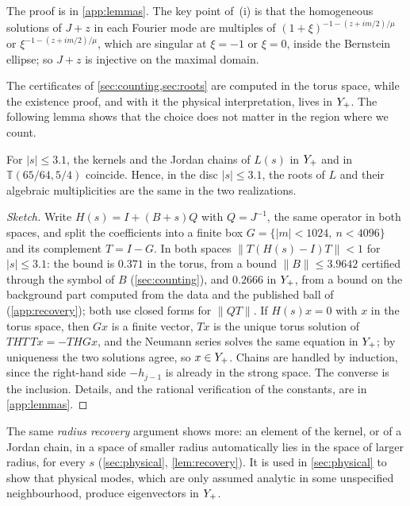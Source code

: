 The proof is in \cref{app:lemmas}. The key point of~(i) is that the homogeneous solutions of $J+z$ in each
Fourier mode are multiples of $(1+\xi)^{-1-(z+im/2)/\mu}$ or $\xi^{-1-(z+im/2)/\mu}$, which are singular at
$\xi=-1$ or $\xi=0$, inside the Bernstein ellipse; so $J+z$ is injective on the maximal domain.

The certificates of \cref{sec:counting,sec:roots} are computed in the torus space, while the existence
proof, and with it the physical interpretation, lives in $Y_{+}$. The following lemma shows that the
choice does not matter in the region where we count.

\begin{lemma}\label{lem:Lreal}
For $|s|\le 3.1$, the kernels and the Jordan chains of $L(s)$ in $Y_{+}$ and in $\mathbb T(65/64,5/4)$
coincide. Hence, in the disc $|s|\le3.1$, the roots of $L$ and their algebraic multiplicities are the same
in the two realizations.
\end{lemma}

\begin{proof}[Sketch]
Write $H(s)=I+(B+s)Q$ with $Q=J^{-1}$, the same operator in both spaces, and split the coefficients into a
finite box $G=\{|m|<1024,\ n<4096\}$ and its complement $T=I-G$. In both spaces
$\|T(H(s)-I)T\|<1$ for $|s|\le3.1$: the bound is $0.371$ in the torus, from a bound
$\|B\|\le3.9642$ certified through the symbol of $B$ (\cref{sec:counting}), and $0.2666$ in $Y_{+}$, from a bound on the
background part computed from the data and the published ball of~\cite{RT2019} (\cref{app:recovery}); both use closed forms for $\|QT\|$. If $H(s)x=0$ with $x$ in the
torus space, then $Gx$ is a finite vector, $Tx$ is the unique torus solution of
$THT\,Tx=-THGx$, and the Neumann series solves the same equation in $Y_{+}$; by uniqueness the two
solutions agree, so $x\in Y_{+}$. Chains are handled by induction, since the right-hand side
$-h_{j-1}$ is already in the strong space. The converse is the inclusion. Details, and the rational
verification of the constants, are in \cref{app:lemmas}.
\end{proof}

\begin{remark}\label{rem:radius}
The same \emph{radius recovery} argument shows more: an element of the kernel, or of a Jordan chain, in
a space of smaller radius automatically lies in the space of larger radius, for every $s$
(\cref{sec:physical}, \cref{lem:recovery}). It is used in \cref{sec:physical} to show that physical modes,
which are only assumed analytic in some unspecified neighbourhood, produce eigenvectors in $Y_{+}$.
\end{remark}

